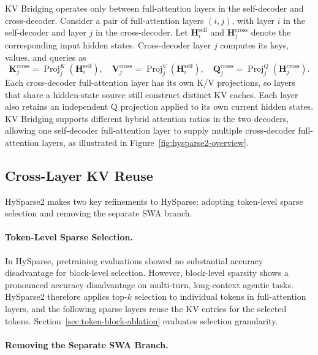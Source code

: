 KV Bridging operates only between full-attention layers in the self-decoder and cross-decoder.
Consider a pair of full-attention layers $(i,j)$, with layer $i$ in the self-decoder and layer $j$ in the cross-decoder.
Let $\mathbf{H}^{\mathrm{self}}_i$ and $\mathbf{H}^{\mathrm{cross}}_j$ denote the corresponding input hidden states.
Cross-decoder layer $j$ computes its keys, values, and queries as
\begin{equation}
    \mathbf{K}^{\mathrm{cross}}_j = \operatorname{Proj}^{K}_{j}\!\left(\mathbf{H}^{\mathrm{self}}_i\right), \quad
    \mathbf{V}^{\mathrm{cross}}_j = \operatorname{Proj}^{V}_{j}\!\left(\mathbf{H}^{\mathrm{self}}_i\right), \quad
    \mathbf{Q}^{\mathrm{cross}}_j = \operatorname{Proj}^{Q}_{j}\!\left(\mathbf{H}^{\mathrm{cross}}_j\right).
\end{equation}
Each cross-decoder full-attention layer has its own K/V projections, so layers that share a hidden-state source still construct distinct KV caches.
Each layer also retains an independent Q projection applied to its own current hidden states.
KV Bridging supports different hybrid attention ratios in the two decoders, allowing one self-decoder full-attention layer to supply multiple cross-decoder full-attention layers, as illustrated in Figure~\ref{fig:hysparse2-overview}.

\subsection{Cross-Layer KV Reuse}
\label{sec:kv-reuse}

HySparse2 makes two key refinements to HySparse: adopting token-level sparse selection and removing the separate SWA branch.

\paragraph{Token-Level Sparse Selection.}

In HySparse, pretraining evaluations showed no substantial accuracy disadvantage for block-level selection.
However, block-level sparsity shows a pronounced accuracy disadvantage on multi-turn, long-context agentic tasks.
HySparse2 therefore applies top-$k$ selection to individual tokens in full-attention layers, and the following sparse layers reuse the KV entries for the selected tokens.
Section~\ref{sec:token-block-ablation} evaluates selection granularity.

\paragraph{Removing the Separate SWA Branch.}

